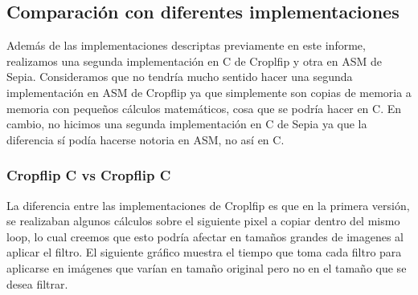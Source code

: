 \documentclass[a4paper]{article}
\begin{document}
\begin{figure}[!ht]
    \centering
    \begin{floatrow}
    \end{floatrow}
\end{figure}

\subsection{Comparación con diferentes implementaciones}
Además de las implementaciones descriptas previamente en este informe, realizamos una segunda implementación en C de Croplfip y otra en ASM de Sepia.
Consideramos que no tendría mucho sentido hacer una segunda implementación en ASM de Cropflip ya que simplemente son copias de memoria a memoria con
pequeños cálculos matemáticos, cosa que se podría hacer en C. En cambio, no hicimos una segunda implementación en C de Sepia ya que la diferencia sí podía hacerse
notoria en ASM, no así en C.

\subsubsection{Cropflip C vs Cropflip C}
La diferencia entre las implementaciones de Croplfip es que en la primera versión, se realizaban algunos cálculos sobre el siguiente pixel a copiar
dentro del mismo loop, lo cual creemos que esto podría afectar en tamaños grandes de imagenes al aplicar el filtro. El siguiente gráfico muestra el tiempo que toma
cada filtro para aplicarse en imágenes que varían en tamaño original pero no en el tamaño que se desea filtrar.
\end{document}
